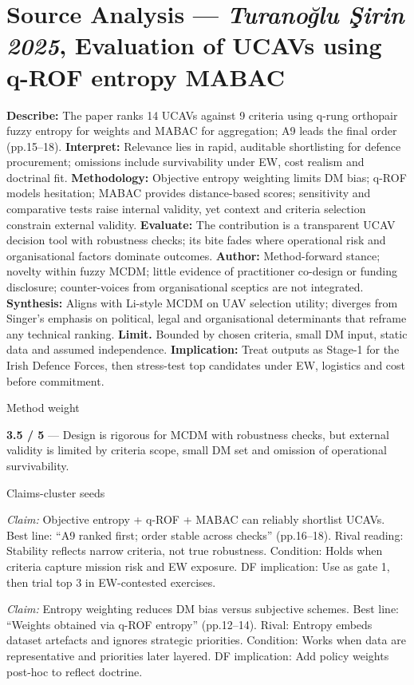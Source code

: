 \section*{Source Analysis — \textit{Turanoğlu Şirin 2025}, Evaluation of UCAVs using q-ROF entropy MABAC}
\textbf{Describe:} The paper ranks 14 UCAVs against 9 criteria using q-rung orthopair fuzzy entropy for weights and MABAC for aggregation; A9 leads the final order (pp.15–18).
\textbf{Interpret:} Relevance lies in rapid, auditable shortlisting for defence procurement; omissions include survivability under EW, cost realism and doctrinal fit.
\textbf{Methodology:} Objective entropy weighting limits DM bias; q-ROF models hesitation; MABAC provides distance-based scores; sensitivity and comparative tests raise internal validity, yet context and criteria selection constrain external validity.
\textbf{Evaluate:} The contribution is a transparent UCAV decision tool with robustness checks; its bite fades where operational risk and organisational factors dominate outcomes.
\textbf{Author:} Method-forward stance; novelty within fuzzy MCDM; little evidence of practitioner co-design or funding disclosure; counter-voices from organisational sceptics are not integrated.
\textbf{Synthesis:} Aligns with Li-style MCDM on UAV selection utility; diverges from Singer’s emphasis on political, legal and organisational determinants that reframe any technical ranking.
\textbf{Limit.} Bounded by chosen criteria, small DM input, static data and assumed independence.
\textbf{Implication:} Treat outputs as Stage-1 for the Irish Defence Forces, then stress-test top candidates under EW, logistics and cost before commitment.

Method weight

\textbf{3.5 / 5} — Design is rigorous for MCDM with robustness checks, but external validity is limited by criteria scope, small DM set and omission of operational survivability.

Claims-cluster seeds

\textit{Claim:} Objective entropy + q-ROF + MABAC can reliably shortlist UCAVs.
Best line: “A9 ranked first; order stable across checks” (pp.16–18). Rival reading: Stability reflects narrow criteria, not true robustness. Condition: Holds when criteria capture mission risk and EW exposure. DF implication: Use as gate 1, then trial top 3 in EW-contested exercises.

\textit{Claim:} Entropy weighting reduces DM bias versus subjective schemes.
Best line: “Weights obtained via q-ROF entropy” (pp.12–14). Rival: Entropy embeds dataset artefacts and ignores strategic priorities. Condition: Works when data are representative and priorities later layered. DF implication: Add policy weights post-hoc to reflect doctrine.

